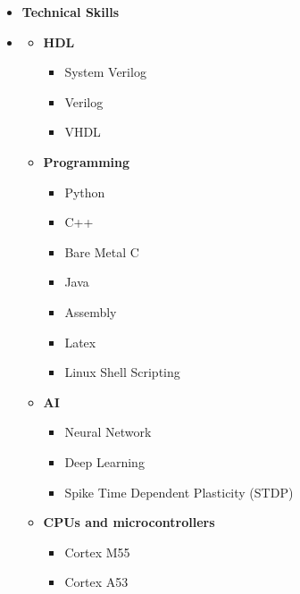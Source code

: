 \begin {itemize} 
    \item [] {\bf \Large  Technical Skills  }  \vspace{-1.5em}
    \item []  {\bf \hrulefill } \mdseries \normalsize 
        \begin {itemize}
            \item [$\bullet$] \bf {\mtf \normalsize  HDL} \mdseries
                    \begin {itemize}
                        \item [-] System Verilog
                        \item [-] Verilog
                        \item [-] VHDL
                    \end {itemize}
              \item [$\bullet$] \bf {\mtf \normalsize  Programming} \mdseries
                    \begin {itemize}
                        \item [-] Python
                        \item [-] C++
                        \item [-] Bare Metal C
                        \item [-] Java
                        \item [-] Assembly
                        \item [-] Latex
                        \item [-] Linux Shell Scripting
                    \end {itemize} 
               \item [$\bullet$] \bf {\mtf \normalsize  AI} \mdseries 
                    \begin {itemize}
                            \item [-] Neural Network
                            \item [-] Deep Learning
                            \item [-] Spike Time Dependent Plasticity (STDP)
                    \end {itemize} 
               \item [$\bullet$] \bf {\mtf \normalsize  CPUs and microcontrollers} \mdseries 
                     \begin {itemize}
                            \item [-] Cortex M55
                            \item [-] Cortex A53

\end{itemize}
\end{itemize}
\end{itemize}
